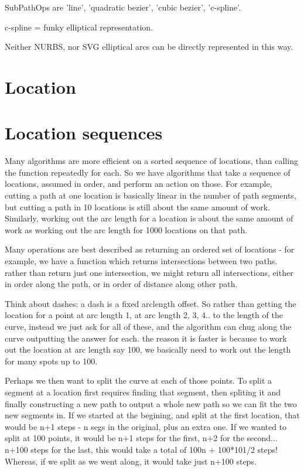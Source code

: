 SubPathOps are 'line', 'quadratic bezier', 'cubic bezier', 'c-spline'.

c-spline = funky elliptical representation.

Neither NURBS, nor SVG elliptical arcs can be directly represented in this way.

\section{Location}

\section{Location sequences}

Many algorithms are more efficient on a sorted sequence of locations,
than calling the function repeatedly for each.  So we have algorithms
that take a sequence of locations, assumed in order, and perform an
action on those.  For example, cutting a path at one location is
basically linear in the number of path segments, but cutting a path in
10 locations is still about the same amount of work.  Similarly,
working out the arc length for a location is about the same amount of
work as working out the arc length for 1000 locations on that path.

Many operations are best described as returning an ordered set of
locations - for example, we have a function which returns
intersections between two paths.  rather than return just one
intersection, we might return all intersections, either in order along
the path, or in order of distance along other path.

Think about dashes: a dash is a fixed arclength offset.  So rather
than getting the location for a point at arc length 1, at arc length
2, 3, 4.. to the length of the curve, instead we just ask for all of
these, and the algorithm can chug along the curve outputting the
answer for each.  the reason it is faster is because to work out the
location at arc length say 100, we basically need to work out the
length for many spots up to 100.

Perhaps we then want to split the curve at each of those points.  To
split a segment at a location first requires finding that segment,
then spliting it and finally constructing a new path to output a whole
new path so we can fit the two new segments in.  If we started at the
begining, and split at the first location, that would be n+1 steps - n
segs in the original, plus an extra one.  If we wanted to split at 100
points, it would be n+1 steps for the first, n+2 for the
second... n+100 steps for the last, this would take a total of 100n +
100*101/2 steps!  Whereas, if we split as we went along, it would take
just n+100 steps.

